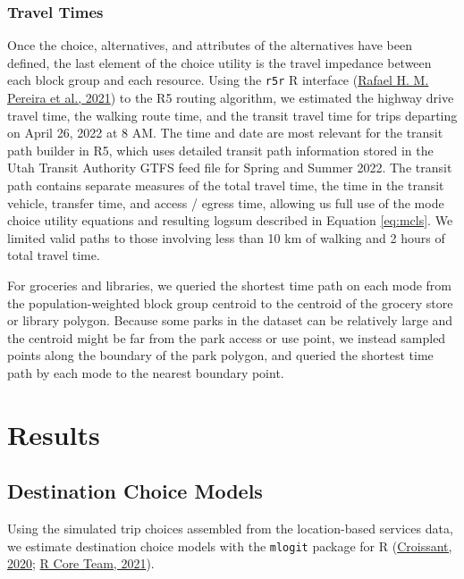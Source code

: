\documentclass[review, 3p]{elsarticle} %
\begin{document}
\hypertarget{travel-times}{%
\subsubsection{Travel Times}\label{travel-times}}

Once the choice, alternatives, and attributes of the alternatives have been
defined, the last element of the choice utility is the travel impedance between
each block group and each resource. Using the \texttt{r5r} R interface (\protect\hyperlink{ref-r5r}{Rafael H. M. Pereira et al., 2021}) to the R5
routing algorithm, we estimated the highway drive travel time, the walking
route time, and the transit travel time for trips departing on April 26,
2022 at 8 AM. The time and date are most relevant for the transit path builder
in R5, which uses detailed transit path information stored in the
Utah Transit Authority GTFS feed file for Spring and Summer 2022. The transit path contains
separate measures of the total travel time, the time in the transit vehicle,
transfer time, and access / egress time, allowing us full use of the
mode choice utility equations and resulting logsum described in Equation \eqref{eq:mcls}.
We limited valid paths to those involving less than 10 km of walking and
2 hours of total travel time.

For groceries and libraries, we queried the shortest time path on each
mode from the population-weighted block group centroid to the centroid of the grocery
store or library polygon. Because some parks in the dataset can be relatively
large and the centroid might be far from the park access or use point, we instead
sampled points along the boundary of the park polygon, and queried the shortest
time path by each mode to the nearest boundary point.

\hypertarget{results}{%
\section{Results}\label{results}}

\hypertarget{destination-choice-models}{%
\subsection{Destination Choice Models}\label{destination-choice-models}}

Using the simulated trip choices assembled from the location-based services data,
we estimate destination choice models with the \texttt{mlogit} package for
R (\protect\hyperlink{ref-mlogit}{Croissant, 2020}; \protect\hyperlink{ref-R}{R Core Team, 2021}).
\end{document}
